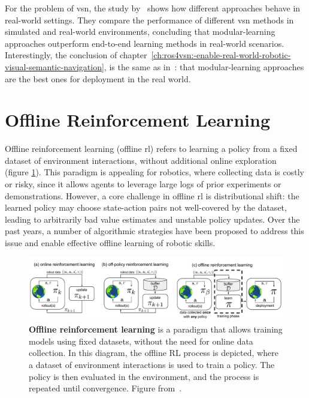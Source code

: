 For the problem of \acrshort{vsn}, the study by~\cite{gervet2022} shows how different approaches behave in real-world settings.
They compare the performance of different \acrshort{vsn} methods in simulated and real-world environments, concluding that modular-learning approaches outperform end-to-end learning methods in real-world scenarios.
Interestingly, the conclusion of chapter~\ref{ch:ros4vsn:-enable-real-world-robotic-visual-semantic-navigation}, is the same as in~\cite{gervet2022}: that modular-learning approaches are the best ones for deployment in the real world.

\section{Offline Reinforcement Learning}\label{sec:offline-reinforcement-learning}

Offline reinforcement learning (offline \acrshort{rl}) refers to learning a policy from a fixed dataset of environment interactions, without additional online exploration~\cite{levine2020} (figure \ref{fig:diagram-offline}).
This paradigm is appealing for robotics, where collecting data is costly or risky, since it allows agents to leverage large logs of prior experiments or demonstrations.
However, a core challenge in offline \acrshort{rl} is distributional shift: the learned policy may choose state-action pairs not well-covered by the dataset, leading to arbitrarily bad value estimates and unstable policy updates.
Over the past years, a number of algorithmic strategies have been proposed to address this issue and enable effective offline learning of robotic skills.

\begin{figure}
    \includegraphics[width=\textwidth]{figures/related_work/diagram_offline}
    \caption[Offline reinforcement learning paradigm]{\textbf{Offline reinforcement learning} is a paradigm that allows training models using fixed datasets, without the need for online data collection.
    In this diagram, the offline RL process is depicted, where a dataset of environment interactions is used to train a policy.
    The policy is then evaluated in the environment, and the process is repeated until convergence.
    Figure from~\cite{levine2020}.}
    \label{fig:diagram-offline}
\end{figure}

